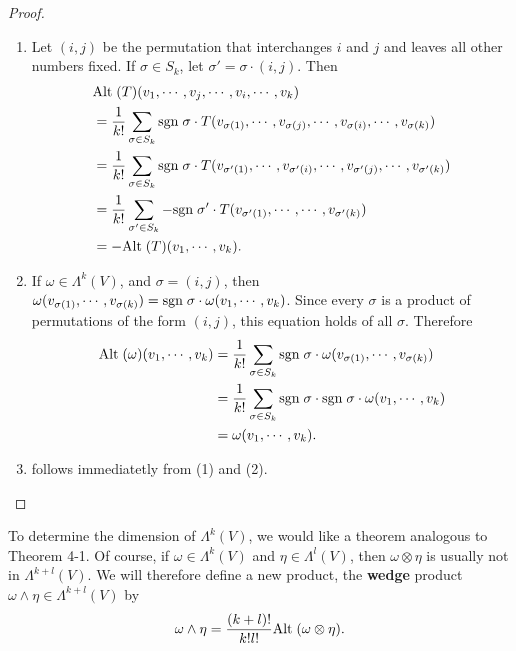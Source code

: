 \begin{proof}
    \begin{enumerate}[label=(\arabic*)]
    \item 
        Let $(i,j)$ be the permutation that interchanges $i$ and $j$ and
        leaves all other numbers fixed. If $\sigma\in S_k$, let $\sigma' = \sigma\cdot (i,j)$.
        Then 
        \begin{align*}
            & \mathrm{Alt}\;(T)(v_1, \cdots, v_j, \cdots, v_i, \cdots, v_k) \\
            & = \frac{1}{k!}\sum_{\sigma\in S_k}^{}{\mathrm{sgn}\; \sigma\cdot T(v_{\sigma(1)}, \cdots, v_{\sigma(j)}, \cdots, v_{\sigma(i)}, \cdots, v_{\sigma(k)})} \\
            & = \frac{1}{k!}\sum_{\sigma\in S_k}^{}{\mathrm{sgn}\; \sigma\cdot T(v_{\sigma'(1)}, \cdots, v_{\sigma'(i)}, \cdots, v_{\sigma'(j)}, \cdots, v_{\sigma'(k)})} \\
            & = \frac{1}{k!}\sum_{\sigma'\in S_k}^{}{-\mathrm{sgn}\; \sigma'\cdot T(v_{\sigma'(1)}, \cdots, \cdots, v_{\sigma'(k)})} \\
            & = -\mathrm{Alt}\;(T)(v_1, \cdots, v_k).
        \end{align*}
    \item If $\omega\in \Lambda^k(V)$, and $\sigma = (i,j)$, then $\omega(v_{\sigma(1)}, \cdots, v_{\sigma(k)})
        =\mathrm{sgn}\;\sigma \cdot \omega(v_1, \cdots, v_k)$. Since every $\sigma$ is a product of permutations 
        of the form $(i,j)$, this equation holds of all $\sigma$. Therefore 
        \begin{align*}
            \mathrm{Alt}\;(\omega)(v_1, \cdots, v_k)
            & = \frac{1}{k!}\sum_{\sigma\in S_k}^{}{\mathrm{sgn}\;\sigma\cdot \omega(v_{\sigma(1)}, \cdots, v_{\sigma(k)})} \\
            & = \frac{1}{k!}\sum_{\sigma\in S_k}^{}{\mathrm{sgn}\;\sigma\cdot \mathrm{sgn}\; \sigma\cdot\omega(v_1, \cdots, v_k)} \\
            & = \omega(v_1, \cdots, v_k).
        \end{align*}
    \item follows immediatetly from (1) and (2).
    \end{enumerate}
\end{proof}

To determine the dimension of $\Lambda^k(V)$, we would like a 
theorem analogous to Theorem 4-1. Of course, if $\omega\in \Lambda^k(V)$
and $\eta\in \Lambda^l(V)$, then $\omega\otimes\eta$ is usually not in 
$\Lambda^{k+l}(V)$. We will therefore define a new product, the \textbf{wedge}
product $\omega\wedge\eta \in \Lambda^{k+l}(V)$ by 
\begin{align*}
    \omega\wedge\eta = \frac{(k+l)!}{k!l!}\mathrm{Alt}\;(\omega\otimes\eta).
\end{align*}

